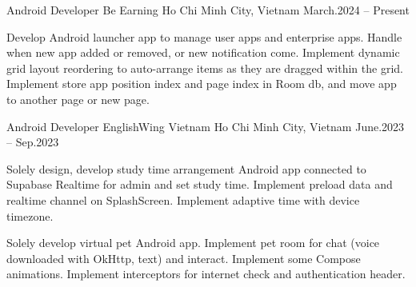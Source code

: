 \begin{cventries}

    \cventry
    {Android Developer}
    {Be Earning}
    {Ho Chi Minh City, Vietnam}
    {March.2024 -- Present}
    {
        \begin{cvitems}
            \item {
                Develop Android launcher app to manage user apps and enterprise apps.
                Handle when new app added or removed, or new notification come.
                Implement dynamic grid layout reordering to auto-arrange items as they are dragged within the grid.
                Implement store app position index and page index in Room db, and move app to another page or new page.
            }
        \end{cvitems}
    }

    \cventry
    {Android Developer}
    {EnglishWing Vietnam}
    {Ho Chi Minh City, Vietnam}
    {June.2023 -- Sep.2023}
    {
        \begin{cvitems}
            \item {
                Solely design, develop study time arrangement Android app connected to Supabase Realtime for admin and set study time.
                Implement preload data and realtime channel on SplashScreen.
                Implement adaptive time with device timezone.
            }
            \item {
                Solely develop virtual pet Android app.
                Implement pet room for chat (voice downloaded with OkHttp, text) and interact.
                Implement some Compose animations.
                Implement interceptors for internet check and authentication header.
            }
        \end{cvitems}
    }
\end{cventries}
